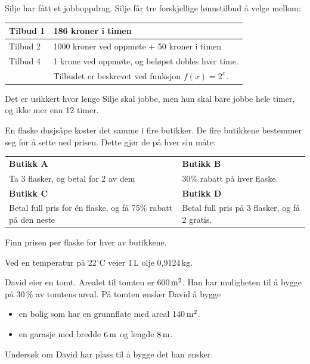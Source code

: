 Silje har fått et jobboppdrag.
Silje får tre forskjellige lønnstilbud å velge mellom:
\begin{center}
	\begin{tabular}{l| l}
		Tilbud 1 & 186 kroner i timen \\ \hline
		Tilbud 2 & 1000 kroner ved oppmøte + 50 kroner i timen \\ \hline
		Tilbud 4 &  1 krone ved oppmøte, og beløpet dobles hver time. \\
		& Tilbudet er beskrevet ved funksjon $f(x)=2^x$.
	\end{tabular}
\end{center}
Det er usikkert hvor lenge Silje skal jobbe, men hun skal bare jobbe hele timer, og ikke mer enn 12 timer.

\newpage
{}
En flaske dusjsåpe koster det samme i fire butikker.
De fire butikkene bestemmer seg for å sette ned prisen.
Dette gjør de på hver sin måte:
\begin{center}
	\begin{tabular}{|p{5cm}|p{5cm}|}
		\hline
		\textbf{Butikk A} & \textbf{Butikk B} \\
		Ta 3 flasker, og 
		betal for 2 av dem	& 30\% rabatt på hver flaske. \\\hline
		\textbf{Butikk C} & \textbf{Butikk D} \\
		Betal full pris for én flaske, og få 75\% rabatt på den neste & Betal full pris på 3 flasker, og få 2 gratis. \\
		\hline
	\end{tabular}
\end{center}
Finn prisen per flaske for hver av butikkene.



Ved en temperatur på 22$^\circ\text{C}$ veier 1\,L olje 0,9124\,kg.

\newpage
{}
David eier en tomt. Arealet til tomten er 600$\,\text{m}^2$. Han har muligheten til å bygge på 30\,\% av tomtens areal.
På tomten ønsker David å bygge
\begin{itemize}
	\item en bolig som har en grunnflate med areal 140$\,\text{m}^2$.
	\item en garasje med bredde $6\,\text{m}$ og lengde $8\,\text{m}$.
\end{itemize}
Undersøk om David har plass til å bygge det han ønsker.

